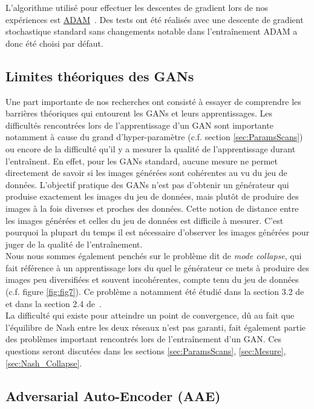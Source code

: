 \documentclass[11pt,francais]{article}
\begin{document}
L'algorithme utilisé pour effectuer les descentes de gradient lors de nos expériences est \href{https://arxiv.org/pdf/1412.6980.pdf}{ADAM}~\cite{kingma2014adam}. Des tests ont été réalisés avec une descente de gradient stochastique standard sans changements notable dans l'entraînement ADAM a donc été choisi par défaut.\\

\subsection{Limites théoriques des GANs}
\label{sec:CompEtLimites}
Une part importante de nos recherches ont consisté à essayer de comprendre les barrières théoriques qui entourent les GANs et leurs apprentissages. Les difficultés rencontrées lors de l'apprentissage d'un GAN sont importante notamment à cause du grand d'hyper-paramètre (c.f. section \ref{sec:ParamsScans}) ou encore de la difficulté qu'il y a mesurer la qualité de l'apprentissage durant l'entraînent. 
En effet, pour les GANs standard, aucune mesure ne permet directement de savoir si les images générées sont cohérentes au vu du jeu de données. L'objectif pratique des GANs n'est pas d'obtenir un générateur qui produise exactement les images du jeu de données, mais plutôt de produire des images à la fois diverses et proches des données. Cette notion de distance entre les images générées et celles du jeu de données est difficile à mesurer. C'est pourquoi la plupart du temps il est nécessaire d'observer les images générées pour juger de la qualité de l'entraînement.\\
Nous nous sommes également penchés sur le problème dit de \textit{mode collapse}, qui fait référence à un apprentissage lors du quel le générateur ce mets à produire des images peu diversifiées et souvent incohérentes, compte tenu du jeu de données (c.f. figure \ref{fig:fig7}). Ce problème a notamment été  étudié dans la section 3.2 de~\cite{salimans2016improved} et dans la section 2.4 de~\cite{DBLP:journals/corr/MetzPPS16}.\\
La difficulté qui existe pour atteindre un point de convergence, dû au fait que l'équilibre de Nash entre les deux réseaux n'est pas garanti, fait également partie des problèmes important rencontrés lors de l'entraînement d'un GAN.
Ces questions seront discutées dans les sections  \ref{sec:ParamsScans}, \ref{sec:Mesure}, \ref{sec:Nash_Collapse}.

\newpage
\subsection{Adversarial Auto-Encoder (AAE)}
\label{sec:AAE}
\end{document}
